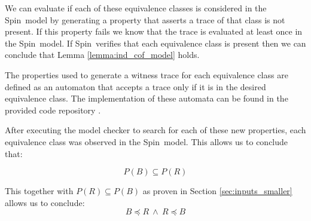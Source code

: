 \documentclass[runningheads]{llncs}
\newcommand{\secref}[1]{Section \ref{#1}}
\newcommand{\spin}{Spin}
\newcommand{\coderepository}{provided code repository \cite{Storey_Extending_Model_Checking_2023}}
\newif\ifcomments
\newif\ifkylecomments
\newcommand{\egm}[1]{\ifcomments\textcolor{orange}{egm: #1}\fi}
\newcommand{\krs}[1]{\ifkylecomments\textcolor{blue}{krs: #1}\fi}
\begin{document}
We can evaluate if each of these equivalence classes is considered in the \spin\ model by generating a property that asserts a trace of that class is not present. If this property fails we know that the trace is evaluated at least once in the \spin\ model. If \spin\ verifies that each equivalence class is present then we can conclude that Lemma \ref{lemma:ind_cof_model} holds.

The properties used to generate a witness trace for each equivalence class are defined as an automaton that accepts a trace only if it is in the desired equivalence class. The implementation of these automata can be found in the \coderepository.
\krs{Good point. Rewritten to omit. I just can't seem to help writing Spin tutorials ;)\egm{Why talk about never claims? In the previous sub-section, we just said check the properties.}}
After executing the model checker to search for each of these new properties, each equivalence class was observed in the \spin\ model. This allows us to conclude that:


$$P(B) \subseteq P(R)$$

This together with $P(R) \subseteq P(B)$ as proven in \secref{sec:inputs_smaller} allows us to conclude:
$$B \preceq R\  \wedge\  R \preceq B$$
    
\end{document}
